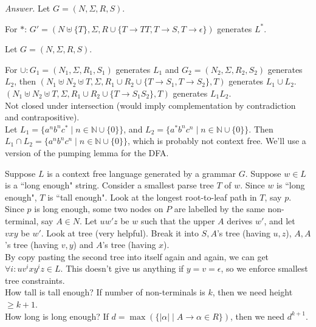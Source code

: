 \documentclass[a4paper]{article}
\newenvironment{ans}{\begin{breakbox}\textit{Answer.}}{\end{breakbox}}
\newcommand{\nl}{\vspace{0.2cm}\\}
\newcommand{\mb}{\mathbb}
\begin{document}
\begin{ans}
    Let $G = (N, \Sigma, R, S)$.

    For $*$: $G' = (N \uplus \{T\}, \Sigma, R \cup \{T \to TT, T \to S, T \to \epsilon\})$ generates $L^*$.

    Let $G = (N, \Sigma, R, S)$.
    
    For $\cup: G_1 = (N_1, \Sigma, R_1, S_1)$ generates $L_1$ and $G_2 = (N_2, \Sigma, R_2, S_2)$ generates $L_2$, then
    $(N_1 \uplus N_2 \uplus T, \Sigma, R_1 \cup R_2 \cup \{T \to S_1, T \to S_2\}, T)$ generates $L_1 \cup L_2$.\nl
    $(N_1 \uplus N_2 \uplus T, \Sigma, R_1 \cup R_2 \cup \{T \to S_1 S_2\}, T)$ generates $L_1 L_2$.\nl

    Not closed under intersection (would imply complementation by contradiction and contrapositive).\nl

    Let $L_1 = \{a^nb^nc^* \mid n \in \mb{N} \cup \{0\}\}$, and $L_2 = \{a^*b^nc^n \mid n \in \mb{N} \cup \{0\}\}$. Then $L_1 \cap L_2 = \{a^nb^nc^n \mid n \in \mb{N} \cup \{0\}\}$, which is
    probably not context free. We'll use a version of the pumping lemma for the DFA.
\end{ans}

\begin{note}
    Suppose $L$ is a context free language generated by a grammar $G$. Suppose $w \in L$ is a ``long enough" string. Consider a smallest parse tree $T$ of $w$. Since $w$ is ``long enough", $T$ is ``tall
    enough". Look at the longest root-to-leaf path in $T$, say $p$.\nl
    Since $p$ is long enough, some two nodes on $P$ are labelled by the same non-terminal, say $A \in N$. Let $uw'z$ be $w$ such that the upper $A$ derives $w'$, and let $vxy$ be $w'$. Look at tree
    (very helpful). Break it into $S, A$'s tree (having $u, z$), $A, A$'s tree (having $v, y$) and $A$'s tree (having $x$).\nl
    By copy pasting the second tree into itself again and again, we can get $\forall i : uv^ixy^iz \in L$. This doesn't give us anything if $y = v = \epsilon$, so we enforce smallest tree
    constraints.\nl
    How tall is tall enough? If number of non-terminals is $k$, then we need height $\ge k + 1$.\nl
    How long is long enough? If $d = \max(\{|\alpha| \mid A \to \alpha \in R\})$, then we need $d^{k+1}$.
\end{note}
\end{document}

